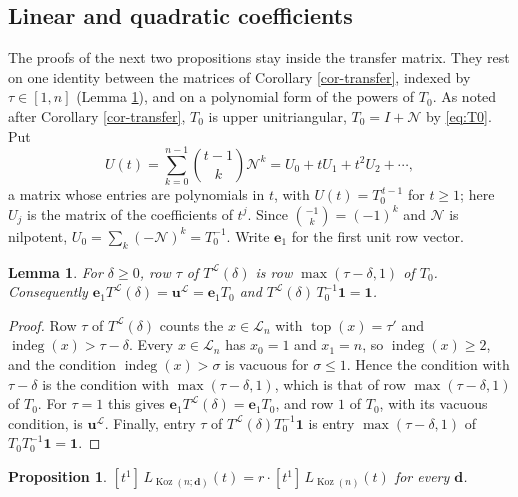 \documentclass[11pt, a4paper, abstract=yes]{scrartcl}
\theoremstyle{definition}
\theoremstyle{remark}
\theoremstyle{plain}
\newtheorem{lemma}[definition]{Lemma}
\newtheorem{proposition}[definition]{Proposition}
\newcommand{\vek}[1]{\boldsymbol{#1}}
\theoremstyle{remark}
\theoremstyle{plain}
\newcommand{\Koz}{\operatorname{Koz}}
\newcommand{\indeg}{\operatorname{indeg}}
\newcommand{\tp}{\operatorname{top}}
\newcommand{\leandiscof}[1]{\tikz[baseline=-0.6ex]\fill[#1] (0,0) circle (0.6ex);}
\newcommand{\leanfull}{\leandiscof{leanfull}}
\newcommand{\leanmark}[1]{\leavevmode{\reversemarginpar\marginnote{\raggedleft#1}}}
\begin{document}
\subsection{Linear and quadratic coefficients}
\label{sec:orgf3225be}

The proofs of the next two propositions stay inside the transfer matrix. They rest on one identity
between the matrices of Corollary \ref{cor-transfer}, indexed by \(\tau\in[1,n]\) (Lemma
\ref{lem-row-shift}), and on a polynomial form of the powers of \(T_0\). As noted after Corollary
\ref{cor-transfer}, \(T_0\) is upper unitriangular, \(T_0=I+\mathcal N\) by \eqref{eq:T0}. Put
\begin{equation}\label{eq:U}
  U(t)=\sum_{k=0}^{n-1}\binom{t-1}k\mathcal N^k=U_0+tU_1+t^2U_2+\cdots ,
\end{equation}
a matrix whose entries are polynomials in \(t\), with \(U(t)=T_0^{\,t-1}\) for \(t\ge1\); here
\(U_j\) is the matrix of the coefficients of \(t^j\). Since \(\binom{-1}k=(-1)^k\) and \(\mathcal N\)
is nilpotent, \(U_0=\sum_k(-\mathcal N)^k=T_0^{-1}\). Write \(\vek e_1\) for the first unit row
vector.

\begin{lemma}
\leanmark{\leanfull}For \(\delta\ge0\), row \(\tau\) of \(T^{\mathcal L}(\delta)\) is row \(\max(\tau-\delta,1)\) of \(T_0\).
Consequently \(\vek e_1T^{\mathcal L}(\delta)=\vek u^{\mathcal L}=\vek e_1T_0\) and
\(T^{\mathcal L}(\delta)\,T_0^{-1}\vek 1=\vek 1\).
\label{lem-row-shift}
\end{lemma}

\begin{proof}
Row \(\tau\) of \(T^{\mathcal L}(\delta)\) counts the \(x\in\mathcal L_n\) with \(\tp(x)=\tau'\) and
\(\indeg(x)>\tau-\delta\). Every \(x\in\mathcal L_n\) has \(x_0=1\) and \(x_1=n\), so \(\indeg(x)\ge2\),
and the condition \(\indeg(x)>\sigma\) is vacuous for \(\sigma\le1\). Hence the condition with
\(\tau-\delta\) is the condition with \(\max(\tau-\delta,1)\), which is that of row
\(\max(\tau-\delta,1)\) of \(T_0\). For \(\tau=1\) this gives \(\vek e_1T^{\mathcal L}(\delta)=\vek e_1T_0\),
and row \(1\) of \(T_0\), with its vacuous condition, is \(\vek u^{\mathcal L}\). Finally, entry
\(\tau\) of \(T^{\mathcal L}(\delta)T_0^{-1}\vek 1\) is entry \(\max(\tau-\delta,1)\) of
\(T_0T_0^{-1}\vek 1=\vek 1\).
\end{proof}

\begin{proposition}
\leanmark{\leanfull}\([t^1]\,L_{\Koz(n;\vek d)}(t)=r\cdot[t^1]\,L_{\Koz(n)}(t)\) for every \(\vek d\).
\label{prop-linear-coeff}
\end{proposition}
\end{document}
